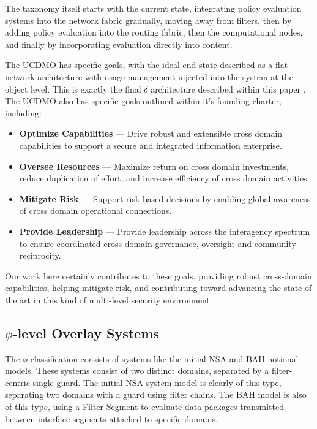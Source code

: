 The taxonomy itself starts with the current state, integrating policy evaluation systems into the network fabric gradually, moving away from filters, then by adding policy evaluation into the routing fabric, then the computational nodes, and finally by incorporating evaluation directly into content.

The UCDMO has specific goals, with the ideal end state described as a flat network architecture with usage management injected into the system at the object level.  This is exactly the final $\delta$ architecture described within this paper \cite{proposal:cd101,proposal:ucdmo-goals}.  The UCDMO also has specific goals outlined within it's founding charter, including:

\begin{itemize}
\item \textbf{Optimize Capabilities} ---  Drive robust and extensible cross domain capabilities to support a secure and integrated information enterprise.
\item \textbf{Oversee Resources} ---  Maximize return on cross domain investments, reduce duplication of effort, and increase efficiency of cross domain activities.
\item \textbf{Mitigate Risk} ---  Support risk-based decisions by enabling global awareness of cross domain operational connections.
\item \textbf{Provide Leadership} ---  Provide leadership across the interagency spectrum to ensure coordinated cross domain governance, oversight and community reciprocity.
\end{itemize}

Our work here certainly contributes to these goals, providing robust cross-domain capabilities, helping mitigate risk, and contributing toward advancing the state of the art in this kind of multi-level security environment.

\subsection{$\phi$-level Overlay Systems}
The $\phi$ classification consists of systems like the initial NSA and BAH notional models.  These systems consist of two distinct domains, separated by a filter-centric single guard.  The initial NSA system model is clearly of this type, separating two domains with a guard using filter chains.  The BAH model is also of this type, using a Filter Segment to evaluate data packages transmitted between interface segments attached to specific domains.

